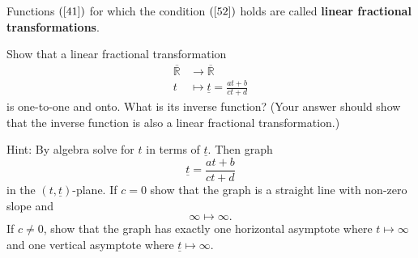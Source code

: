 \documentclass{ximera}
\begin{document}
\begin{definition}
Functions $\left( \ref{41}\right) $ for which the condition $\left(
\ref{52}\right)  $ holds are called \textbf{linear fractional transformations}.
\end{definition}


\begin{exercise}
Show that a linear fractional transformation%
\begin{align*}
\overline{\mathbb{R}} &\rightarrow\overline{\mathbb{R}}\\
t &\mapsto\underline{t} =\frac{at+b}{ct+d}%
\end{align*}
is one-to-one and onto. What is its inverse function? (Your answer should show that
the inverse function is also a linear fractional transformation.)

Hint: By algebra solve for $t$ in terms of $\underline{t}$. Then graph%
\[
\underline{t}=\frac{at+b}{ct+d}%
\]
in the $\left(  t,\underline{t}\right)  $-plane. If $c=0$ show that the graph
is a straight line with non-zero slope and%
\[
\infty\mapsto\infty.
\]
If $c\neq0$, show that the graph has exactly one horizontal asymptote where
$t\mapsto\infty$ and one vertical asymptote where $\underline{t}\mapsto\infty$.

\begin{solution}
\end{solution}
\end{exercise}
\end{document}
